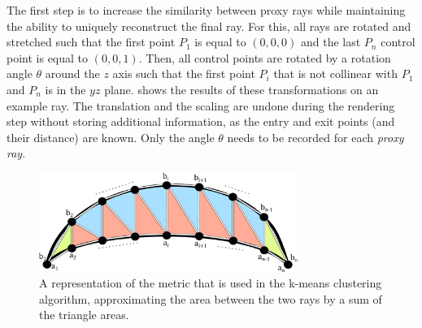 
The first step is to increase the similarity between proxy rays while maintaining the ability to uniquely reconstruct the final ray.  For this, all rays are rotated and stretched such that the first point $P_1$ is equal to $(0,0,0)$ and the last $P_n$ control point is equal to $(0,0,1)$.  Then, all control points are rotated by a rotation angle $\theta$ around the $z$ axis such that the first point $P_i$ that is not collinear with $P_1$ and $P_n$ is in the $yz$ plane.   shows the results of these transformations on an example ray.  The translation and the scaling are undone during the rendering step without storing additional information, as the entry and exit points (and their distance) are known.  Only the angle $\theta$ needs to be recorded for each \emph{proxy ray}.

\begin{figure}
\centering
\includegraphics[width=0.75\textwidth]{figures/contributions/fem/metric.pdf}
\caption{A representation of the metric that is used in the k-means clustering algorithm, approximating the area between the two rays by a sum of the triangle areas.}
\label{contributions:fem:metric}
\end{figure}

